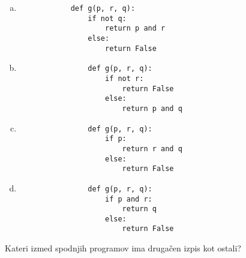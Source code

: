 \documentclass[arhiv, 10pt]{../izpit}
\begin{document}
        \begin{multicols}{2}
        \begin{enumerate}[(a)]
\item 
            \begin{verbatim}
            def g(p, r, q):
                if not q:
                    return p and r
                else:
                    return False
            \end{verbatim}
        
\item 
                \begin{verbatim}
                def g(p, r, q):
                    if not r:
                        return False
                    else:
                        return p and q
                \end{verbatim}
            
\item 
                \begin{verbatim}
                def g(p, r, q):
                    if p:
                        return r and q
                    else:
                        return False
                \end{verbatim}
            
\item 
                \begin{verbatim}
                def g(p, r, q):
                    if p and r:
                        return q
                    else:
                        return False
                \end{verbatim}
            
\end{enumerate}

        \end{multicols}
    
        \naloga*
        
        Kateri izmed spodnjih programov ima drugačen izpis kot ostali?
    
\end{document}
